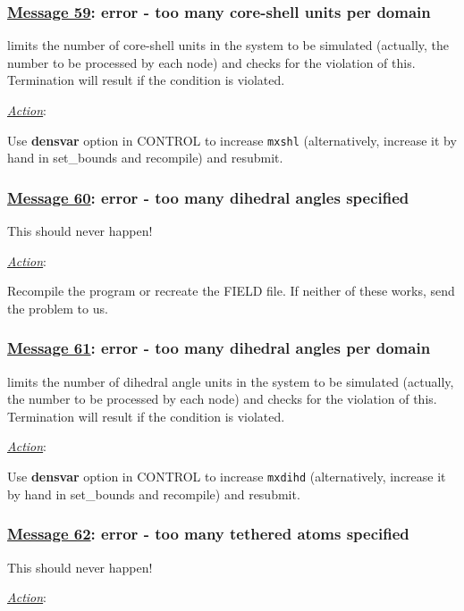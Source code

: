 \subsubsection*{\underline{Message 59}: error - too many core-shell units per domain}

\D limits the number of core-shell units
in the system to be simulated (actually, the number to be processed
by each node) and checks for the violation of this.  Termination will
result if the condition is violated.

\noindent \underline{\em Action}:

Use {\bf densvar} option in CONTROL to increase {\tt mxshl}
(alternatively, increase it by hand in {\sc set\_bounds} and
recompile) and resubmit.

\subsubsection*{\underline{Message 60}: error - too many dihedral angles specified}

This should never happen!

\noindent \underline{\em Action}:

Recompile the program or recreate the FIELD file.  If neither of
these works, send the problem to us.

\subsubsection*{\underline{Message 61}: error - too many dihedral angles per domain}

\D limits the number of dihedral angle units
in the system to be simulated (actually, the number to be processed
by each node) and checks for the violation of this.  Termination will
result if the condition is violated.

\noindent \underline{\em Action}:

Use {\bf densvar} option in CONTROL to increase {\tt mxdihd}
(alternatively, increase it by hand in {\sc set\_bounds} and
recompile) and resubmit.

\subsubsection*{\underline{Message 62}: error - too many tethered atoms specified}

This should never happen!

\noindent \underline{\em Action}:

